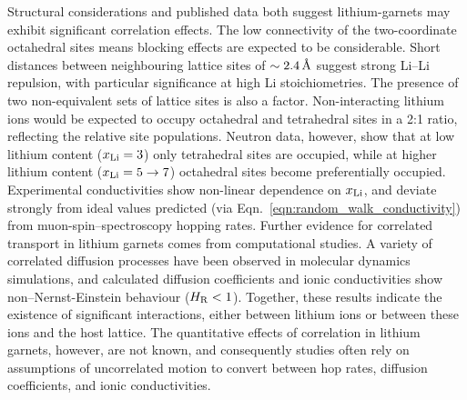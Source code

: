 \documentclass[aps,prb,twocolumn,superscriptaddress,reprint]{revtex4-1}
\newcommand{\xLi}{x_\m{Li}}
\newcommand{\angstrom}{\mbox{\normalfont\AA}}
\begin{document}
Structural considerations and published data both suggest lithium-garnets may exhibit significant correlation effects. The low connectivity of the two-coordinate octahedral sites means blocking effects are expected to be considerable.\cite{AwakaEtAl_ChemLett2011} Short distances between neighbouring lattice sites of $\sim2.4\,\mathrm{\angstrom}$ suggest strong Li--Li repulsion, with particular significance at high Li stoichiometries.\cite{OCallaghanAndCussen_ChemComm2007,OCallaghanAndCussen_SolStatSci2008,Cussen_JMaterChem2010,WangEtAl_SolStatIonics2014} The presence of two non-equivalent sets of lattice sites is also a factor. Non-interacting lithium ions would be expected to occupy octahedral and tetrahedral sites in a 2:1 ratio, reflecting the relative site populations. 
Neutron data, however, show that at low lithium content ($\xLi=3$) only tetrahedral sites are occupied,\cite{OCallaghanEtAl_ChemMater2006} while at higher lithium content ($\xLi=5\to7$) octahedral sites become preferentially occupied.\cite{Cussen_JMaterChem2010,ThangaduraiEtAl_JPhysChemLett2015} Experimental conductivities show non-linear dependence on $\xLi$,\cite{ThompsonEtAl_AdvEnergyMater2015} and deviate strongly from ideal values predicted (via Eqn.~\ref{eqn:random_walk_conductivity}) from muon-spin--spectroscopy hopping rates.\cite{NozakiEtAl_SolStatIonics2014} Further evidence for correlated transport in lithium garnets comes from computational studies. A variety of correlated diffusion processes have been observed in molecular dynamics simulations,\cite{JalemEtAl_ChemMater2013, MeierEtAl_JPhysChemC2014,KlenkAndLai_PhysChemChemPhys2015, BurbanoEtAl_PhysRevLett2016} and calculated diffusion coefficients and ionic conductivities show non--Nernst-Einstein behaviour ($H_{\mathrm{R}}<1$).\cite{KlenkAndLai_SolStatIonics2016, Burbano_Garnets_InPreparation} Together, these results indicate the existence of significant interactions, either between lithium ions or between these ions and the host lattice. The quantitative effects of correlation in lithium garnets, however, are not known, and consequently studies often rely on assumptions of uncorrelated motion to convert between hop rates, diffusion coefficients, and ionic conductivities.\cite{KuhnEtAl_PhysRevB2011,KuhnEtAl_JPhys-CondensMat2011,MiaraEtAl_ChemMater2013,Rustad_arXiv2016,GuEtAl_SolStatIonics2015,NozakiEtAl_SolStatIonics2014,ZeierEtAl_ACSApplMaterInt2014,JalemEtAl_ChemMater2013,AdamsAndRao_JMaterChem2012,DuvelEtAl_JPhysChemC2012,NarayananEtAl_RSCAdv2012,RamzyAndThangadurai_ACSApplMaterInt2010,AmoresEtAl_JMaterChemA2016}
\end{document}
